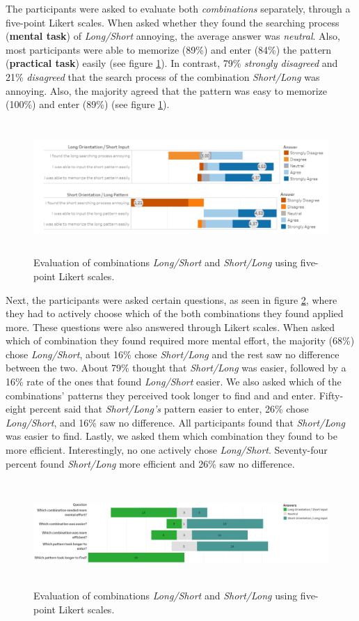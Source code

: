 The participants were asked to evaluate both \textit{combinations} separately, through a five-point Likert scales. When asked whether they found the searching process (\textbf{mental task}) of \textit{Long/Short} annoying, the average answer was \textit{neutral}. Also, most participants were able to memorize (89\%) and enter (84\%) the pattern (\textbf{practical task}) easily (see figure \ref{fig:likert}). In contrast, 79\% \textit{strongly disagreed} and 21\% \textit{disagreed} that the search process of the combination \textit{Short/Long} was annoying. Also, the majority agreed that the pattern was easy to memorize (100\%) and enter (89\%) (see figure \ref{fig:likert}).
 
 \begin{figure}[t!]
\centering
\includegraphics[width=15cm, height=5cm]{Chapters/graphics/Likert1213.PNG}
\caption{Evaluation of combinations \textit{Long/Short} and \textit{Short/Long} using five-point Likert scales. }
\label{fig:likert}
\end{figure}

Next, the participants were asked certain questions, as seen in figure \ref{fig:likert2}, where they had to actively choose which of the both combinations they found applied more. These questions were also answered through Likert scales. When asked which of combination they found required more mental effort, the majority (68\%) chose \textit{Long/Short}, about 16\% chose \textit{Short/Long} and the rest saw no difference between the two. 
About 79\% thought that \textit{Short/Long} was easier, followed by a 16\% rate of the ones that found \textit{Long/Short} easier. We also asked which of the combinations' patterns they perceived took longer to find and and enter. Fifty-eight percent said that \textit{Short/Long's} pattern easier to enter, 26\% chose \textit{Long/Short}, and 16\% saw no difference. All participants found that \textit{Short/Long} was easier to find. Lastly, we asked them which combination they found to be more efficient. Interestingly, no one actively chose \textit{Long/Short}. Seventy-four percent found \textit{Short/Long} more efficient and 26\% saw no difference.

\begin{figure}[t!]
\centering
\includegraphics[width=15cm, height=4cm]{Chapters/graphics/Likert2.png}
\caption{Evaluation of combinations \textit{Long/Short} and \textit{Short/Long} using five-point Likert scales. }
\label{fig:likert2}
\end{figure}




